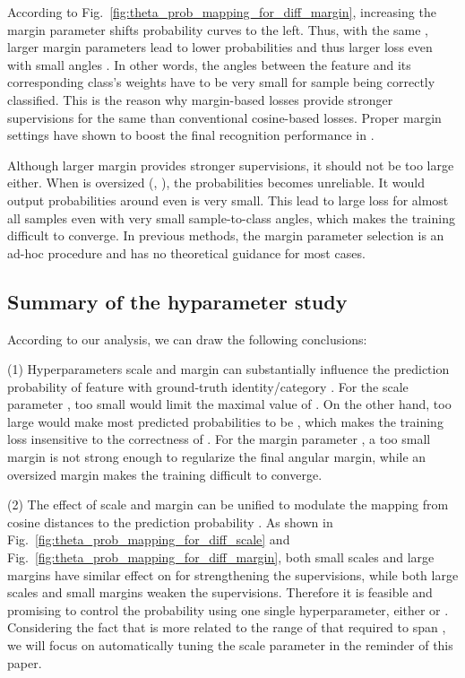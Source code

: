 \documentclass[10pt,twocolumn,letterpaper]{article}
\begin{document}
According to Fig.~\ref{fig:theta_prob_mapping_for_diff_margin}, increasing the margin parameter shifts probability  curves to the left. Thus, with the same , larger margin parameters lead to lower probabilities  and thus larger loss even with small angles . In other words, the angles  between the feature  and its corresponding class's weights  have to be very small for sample  being correctly classified. This is the reason why margin-based losses provide stronger supervisions for the same  than conventional cosine-based losses. Proper margin settings have shown to boost the final recognition performance in \cite{CosFace,ArcFace}.

Although larger margin  provides stronger supervisions, it should not be too large either. When  is oversized (\eg, ), the probabilities  becomes unreliable. It would output probabilities around  even  is very small. This lead to large loss for almost all samples even with very small  sample-to-class angles, which makes the training difficult to converge. In previous methods, the margin parameter selection is an ad-hoc procedure and has no theoretical guidance for most cases.


\subsection{Summary of the hyparameter study}
According to our analysis, we can draw the following conclusions:

(1) Hyperparameters scale  and margin  can substantially influence the prediction probability  of feature  with ground-truth identity/category . 
For the scale parameter , too small  would limit the maximal value of . On the other hand, too large  would make most predicted probabilities  to be , which makes the training loss insensitive to the correctness of .
For the margin parameter , a too small margin is not strong enough to regularize the final angular margin, while an oversized margin makes the training difficult to converge.

(2) The effect of scale  and margin  can be unified to modulate the mapping from cosine distances  to the prediction probability . As shown in Fig.~\ref{fig:theta_prob_mapping_for_diff_scale} and Fig.~\ref{fig:theta_prob_mapping_for_diff_margin}, both small scales and large margins have similar effect on  for strengthening the supervisions, while both large scales and small margins weaken the supervisions. Therefore it is feasible and promising to control the probability   using one single hyperparameter, either  or . Considering the fact that  is more related to the range of  that required to span , we will focus on automatically tuning the scale parameter  in the reminder of this paper. 
\end{document}
